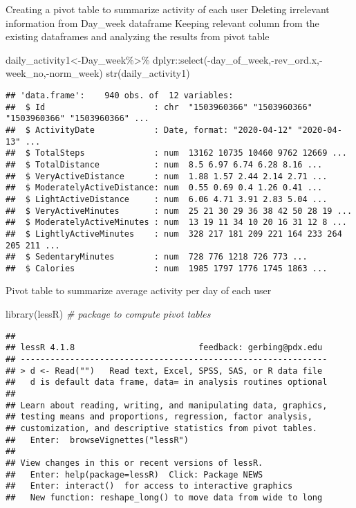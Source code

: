 \documentclass[
]{article}
\newenvironment{Shaded}{\begin{snugshade}}{\end{snugshade}}
\newcommand{\CommentTok}[1]{\textcolor[rgb]{0.56,0.35,0.01}{\textit{#1}}}
\newcommand{\FunctionTok}[1]{\textcolor[rgb]{0.00,0.00,0.00}{#1}}
\newcommand{\NormalTok}[1]{#1}
\newcommand{\OtherTok}[1]{\textcolor[rgb]{0.56,0.35,0.01}{#1}}
\newcommand{\SpecialCharTok}[1]{\textcolor[rgb]{0.00,0.00,0.00}{#1}}
\begin{document}
Creating a pivot table to summarize activity of each user Deleting
irrelevant information from Day\_week dataframe Keeping relevant column
from the existing dataframes and analyzing the results from pivot table

\begin{Shaded}
\begin{Highlighting}[]
\NormalTok{daily\_activity1}\OtherTok{\textless{}{-}}\NormalTok{Day\_week}\SpecialCharTok{\%\textgreater{}\%}
\NormalTok{  dplyr}\SpecialCharTok{::}\FunctionTok{select}\NormalTok{(}\SpecialCharTok{{-}}\NormalTok{day\_of\_week,}\SpecialCharTok{{-}}\NormalTok{rev\_ord.x,}\SpecialCharTok{{-}}\NormalTok{week\_no,}\SpecialCharTok{{-}}\NormalTok{norm\_week)}
\FunctionTok{str}\NormalTok{(daily\_activity1)}
\end{Highlighting}
\end{Shaded}

\begin{verbatim}
## 'data.frame':    940 obs. of  12 variables:
##  $ Id                      : chr  "1503960366" "1503960366" "1503960366" "1503960366" ...
##  $ ActivityDate            : Date, format: "2020-04-12" "2020-04-13" ...
##  $ TotalSteps              : num  13162 10735 10460 9762 12669 ...
##  $ TotalDistance           : num  8.5 6.97 6.74 6.28 8.16 ...
##  $ VeryActiveDistance      : num  1.88 1.57 2.44 2.14 2.71 ...
##  $ ModeratelyActiveDistance: num  0.55 0.69 0.4 1.26 0.41 ...
##  $ LightActiveDistance     : num  6.06 4.71 3.91 2.83 5.04 ...
##  $ VeryActiveMinutes       : num  25 21 30 29 36 38 42 50 28 19 ...
##  $ ModeratelyActiveMinutes : num  13 19 11 34 10 20 16 31 12 8 ...
##  $ LightlyActiveMinutes    : num  328 217 181 209 221 164 233 264 205 211 ...
##  $ SedentaryMinutes        : num  728 776 1218 726 773 ...
##  $ Calories                : num  1985 1797 1776 1745 1863 ...
\end{verbatim}

Pivot table to summarize average activity per day of each user

\begin{Shaded}
\begin{Highlighting}[]
\FunctionTok{library}\NormalTok{(lessR) }\CommentTok{\# package to compute pivot tables}
\end{Highlighting}
\end{Shaded}

\begin{verbatim}
## 
## lessR 4.1.8                         feedback: gerbing@pdx.edu 
## --------------------------------------------------------------
## > d <- Read("")   Read text, Excel, SPSS, SAS, or R data file
##   d is default data frame, data= in analysis routines optional
## 
## Learn about reading, writing, and manipulating data, graphics,
## testing means and proportions, regression, factor analysis,
## customization, and descriptive statistics from pivot tables.
##   Enter:  browseVignettes("lessR")
## 
## View changes in this or recent versions of lessR.
##   Enter: help(package=lessR)  Click: Package NEWS
##   Enter: interact()  for access to interactive graphics
##   New function: reshape_long() to move data from wide to long
\end{verbatim}
\end{document}
